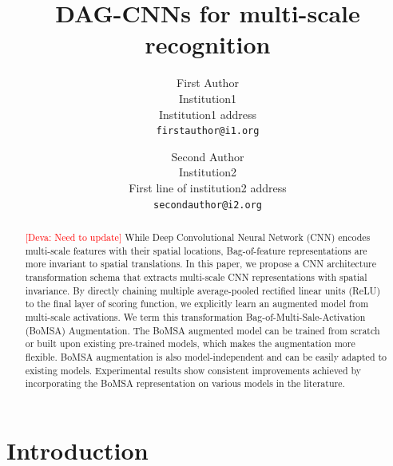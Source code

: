 \documentclass[10pt,twocolumn,letterpaper]{article}
\newcommand{\deva}[1]{\textcolor{red}{[Deva: #1]}}
\begin{document}
\title{DAG-CNNs for multi-scale recognition}

\author{First Author\\
Institution1\\
Institution1 address\\
{\tt\small firstauthor@i1.org}
\and
Second Author\\
Institution2\\
First line of institution2 address\\
{\tt\small secondauthor@i2.org}
}

\maketitle

\begin{abstract}
\deva{Need to update}
While Deep Convolutional Neural Network (CNN) encodes multi-scale features with their spatial locations, Bag-of-feature representations are more invariant to spatial translations. In this paper, we propose a CNN architecture transformation schema that extracts multi-scale CNN representations with spatial invariance. By directly chaining multiple average-pooled rectified linear units (ReLU) to the final layer of scoring function, we explicitly learn an augmented model from multi-scale activations. We term this transformation Bag-of-Multi-Sale-Activation (BoMSA) Augmentation. The BoMSA augmented model can be trained from scratch or built upon existing pre-trained models, which makes the augmentation more flexible. BoMSA augmentation is also model-independent and can be easily adapted to existing models. Experimental results show consistent improvements achieved by incorporating the BoMSA representation on various models in the literature.  

\end{abstract}

\section{Introduction}
\end{document}
